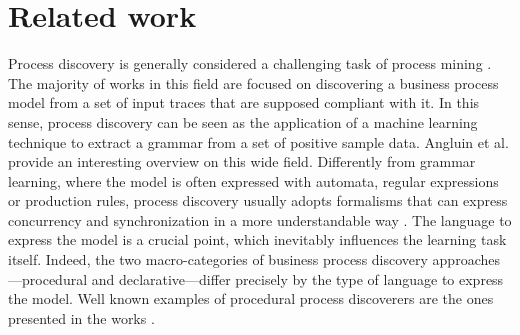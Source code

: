 
\section{Related work}
\label{sec:related}

Process discovery is generally considered a challenging task of process mining \cite{2012-Maggi}. The majority of works in this field are focused on discovering a business process model from a set of input traces that are supposed compliant with it. In this sense, process discovery can be seen as the application of a machine learning technique to extract a grammar from a set of positive sample data. Angluin et al. \cite{1983-Angliun} provide an interesting overview on this wide field.
Differently from grammar learning, where the model is often expressed with automata, regular expressions or production rules, process discovery usually adopts formalisms that can express concurrency and synchronization in a more understandable way \cite{2009-Goedertier}. 
The language to express the model is a crucial point, which inevitably influences the learning task itself. Indeed, the two macro-categories of business process discovery approaches---procedural and declarative---differ precisely by the type of language to express the model. 
Well known examples of procedural process discoverers are the ones presented in the works \cite{2003-Weijters,2004-Aalst,2007-Gunther,2010-Aalst,2013-Leemans,2015-Guo,2017-Augusto}.
